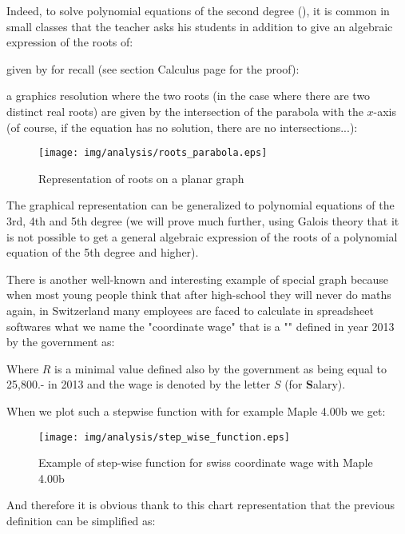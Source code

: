 Indeed, to solve polynomial equations of the second degree (), it is common in small classes that the teacher asks his students in addition to give an algebraic expression of the roots of:
	
given by for recall (see section Calculus page \pageref{double root} for the proof):
	
a graphics resolution where the two roots (in the case where there are two distinct real roots) are given by the intersection of the parabola with the $x$-axis (of course, if the equation has no solution, there are no intersections...):

\begin{figure}[H]
\centering
\texttt{[image: img/analysis/roots\_parabola.eps]}
\caption{Representation of roots on a planar graph}
\end{figure}

The graphical representation can be generalized to polynomial equations of the 3rd, 4th and 5th degree (we will prove much further, using Galois theory that it is not possible to get a general algebraic expression of the roots of a polynomial equation of the 5th degree and higher).

There is another well-known and interesting example of special graph because when most young people think that after high-school they will never do maths again, in Switzerland many employees are faced to calculate in spreadsheet softwares what we name the "coordinate wage" that is a "" defined in year 2013 by the government as:

	

Where $R$ is a minimal value defined also by the government as being equal to 25,800.- in 2013 and the wage is denoted by the letter $S$ (for \textbf{S}alary).

When we plot such a stepwise function with for example Maple 4.00b we get:

\begin{figure}[H]
\centering
\texttt{[image: img/analysis/step\_wise\_function.eps]}
\caption{Example of step-wise function for swiss coordinate wage with Maple 4.00b}
\end{figure}

And therefore it is obvious thank to this chart representation that the previous definition can be simplified as:

	


